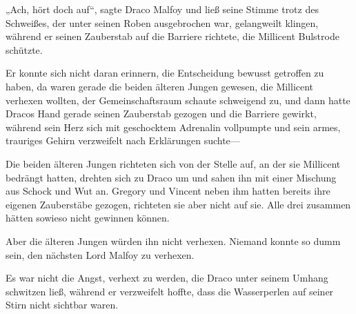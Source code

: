 „Ach, hört doch auf“, sagte Draco Malfoy und ließ seine Stimme trotz des Schweißes, der unter seinen Roben ausgebrochen war, gelangweilt klingen, während er seinen Zauberstab auf die Barriere richtete, die Millicent Bulstrode schützte.

Er konnte sich nicht daran erinnern, die Entscheidung bewusst getroffen zu haben, da waren gerade die beiden älteren Jungen gewesen, die Millicent verhexen wollten, der Gemeinschaftsraum schaute schweigend zu, und dann hatte Dracos Hand gerade seinen Zauberstab gezogen und die Barriere gewirkt, während sein Herz sich mit geschocktem Adrenalin vollpumpte und sein armes, trauriges Gehirn verzweifelt nach Erklärungen suchte—

Die beiden älteren Jungen richteten sich von der Stelle auf, an der sie Millicent bedrängt hatten, drehten sich zu Draco um und sahen ihn mit einer Mischung aus Schock und Wut an. Gregory und Vincent neben ihm hatten bereits ihre eigenen Zauberstäbe gezogen, richteten sie aber nicht auf sie. Alle drei zusammen hätten sowieso nicht gewinnen können.

Aber die älteren Jungen würden ihn nicht verhexen. Niemand konnte so dumm sein, den nächsten Lord Malfoy zu verhexen.

Es war nicht die Angst, verhext zu werden, die Draco unter seinem Umhang schwitzen ließ, während er verzweifelt hoffte, dass die Wasserperlen auf seiner Stirn nicht sichtbar waren.

